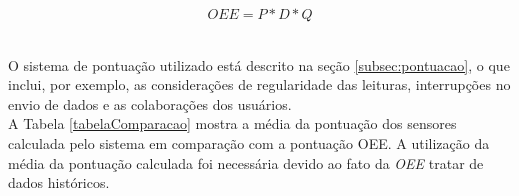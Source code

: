 \begin{equation}
  OEE = P * D * Q
  \label{eq:OEE}
\end{equation}

\begin{center}
\label{tabelaOEE}
\end{center}

\\\null \quad O sistema de pontuação utilizado está descrito na seção \ref{subsec:pontuacao}, o que inclui, por exemplo, as considerações de regularidade das leituras, interrupções no envio de dados e as colaborações dos usuários.
\\\null \quad A Tabela \ref{tabelaComparacao} mostra a média da pontuação dos sensores calculada pelo sistema em comparação com a pontuação \acrshort{OEE}. A utilização da média da pontuação calculada foi necessária devido ao fato da \textit{\acrlong{OEE}} tratar de dados históricos.

